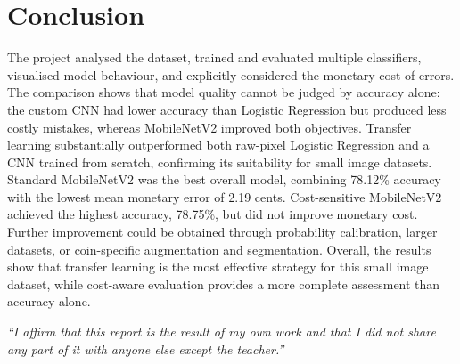 \documentclass[10pt,a4paper]{article}
\begin{document}
\section{Conclusion}

The project analysed the dataset, trained and evaluated multiple classifiers, visualised model
behaviour, and explicitly considered the monetary cost of errors. The comparison shows that model
quality cannot be judged by accuracy alone: the custom CNN had lower accuracy than Logistic
Regression but produced less costly mistakes, whereas MobileNetV2 improved both objectives.
Transfer learning substantially outperformed both raw-pixel Logistic Regression and a CNN trained
from scratch, confirming its suitability for small image datasets. Standard MobileNetV2 was the
best overall model, combining 78.12\% accuracy with the lowest mean monetary error of 2.19 cents.
Cost-sensitive MobileNetV2 achieved the highest accuracy, 78.75\%, but did not improve monetary
cost. Further improvement could be obtained through probability calibration, larger datasets, or
coin-specific augmentation and segmentation. Overall, the results show that transfer learning is
the most effective strategy for this small image dataset, while cost-aware evaluation provides a
more complete assessment than accuracy alone.

\vfill
\begin{center}
\textit{“I affirm that this report is the result of my own work and that I did not share any part
of it with anyone else except the teacher.”}
\end{center}
\end{document}
